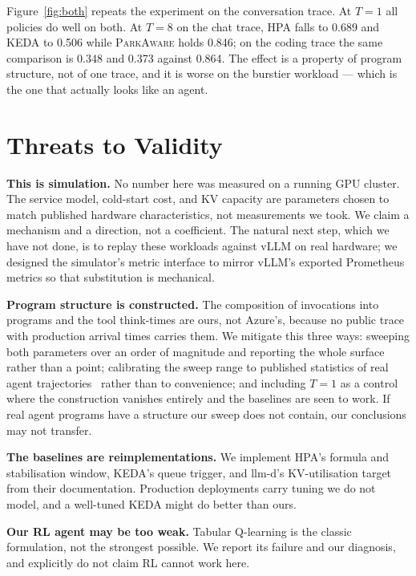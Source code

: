 \documentclass[sigconf,nonacm]{acmart}
\newcommand{\sys}{\textsc{ParkAware}\xspace}
\begin{document}
Figure~\ref{fig:both} repeats the experiment on the conversation trace. At
$T{=}1$ all policies do well on both. At $T{=}8$ on the chat trace, HPA
falls to 0.689 and KEDA to 0.506 while \sys holds 0.846; on the coding
trace the same comparison is 0.348 and 0.373 against 0.864. The effect is
a property of program structure, not of one trace, and it is worse on the
burstier workload --- which is the one that actually looks like an agent.

\section{Threats to Validity}
\label{sec:threats}

\textbf{This is simulation.} No number here was measured on a running GPU
cluster. The service model, cold-start cost, and KV capacity are
parameters chosen to match published hardware characteristics, not
measurements we took. We claim a mechanism and a direction, not a
coefficient. The natural next step, which we have not done, is to replay
these workloads against vLLM on real hardware; we designed the
simulator's metric interface to mirror vLLM's exported Prometheus metrics
so that substitution is mechanical.

\textbf{Program structure is constructed.} The composition of invocations
into programs and the tool think-times are ours, not Azure's, because no
public trace with production arrival times carries them. We mitigate this
three ways: sweeping both parameters over an order of magnitude and
reporting the whole surface rather than a point; calibrating the sweep
range to published statistics of real agent trajectories~\cite{polar}
rather than to convenience; and including $T{=}1$ as a control where the
construction vanishes entirely and the baselines are seen to work. If real
agent programs have a structure our sweep does not contain, our
conclusions may not transfer.

\textbf{The baselines are reimplementations.} We implement HPA's formula
and stabilisation window, KEDA's queue trigger, and llm-d's KV-utilisation
target from their documentation. Production deployments carry tuning we do
not model, and a well-tuned KEDA might do better than ours.

\textbf{Our RL agent may be too weak.} Tabular Q-learning is the classic
formulation, not the strongest possible. We report its failure and our
diagnosis, and explicitly do not claim RL cannot work here.
\end{document}
